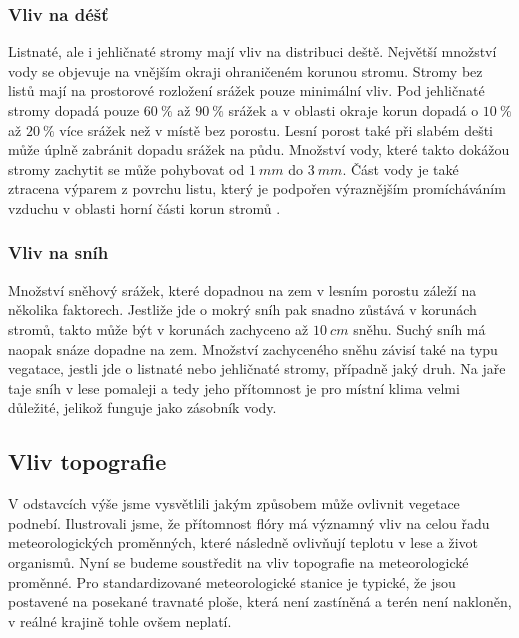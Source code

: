 \subsubsection{Vliv na déšť}
Listnaté, ale i jehličnaté stromy mají vliv na distribuci deště. Největší množství vody se objevuje na vnějším okraji ohraničeném korunou stromu. Stromy bez listů mají na prostorové rozložení srážek pouze minimální vliv. Pod jehličnaté stromy dopadá pouze $\SI{60}{\%}$ až $\SI{90}{\%}$ srážek a v oblasti okraje korun dopadá o $\SI{10}{\%}$ až $\SI{20}{\%}$ více srážek než v místě bez porostu. Lesní porost také při slabém dešti může úplně zabránit dopadu srážek na půdu. Množství vody, které takto dokážou stromy zachytit se může pohybovat od $\SI{1}{mm}$ do $\SI{3}{mm}$. Část vody je také ztracena výparem z povrchu listu, který je podpořen výraznějším promícháváním vzduchu v oblasti horní části korun stromů \cite{alma}.

\subsubsection{Vliv na sníh}
Množství sněhový srážek, které dopadnou na zem v lesním porostu záleží na několika faktorech. Jestliže jde o mokrý sníh pak snadno zůstává v korunách stromů, takto může být v korunách zachyceno až $\SI{10}{cm}$ sněhu. Suchý sníh má naopak snáze dopadne na zem. Množství zachyceného sněhu závisí také na typu vegatace, jestli jde o listnaté nebo jehličnaté stromy, případně jaký druh. Na jaře taje sníh v lese pomaleji a tedy jeho přítomnost je pro místní klima velmi důležité, jelikož funguje jako zásobník vody\cite{alma}.

\subsection{Vliv topografie} \label{chap:topo}
V odstavcích výše jsme vysvětlili jakým způsobem může ovlivnit vegetace podnebí. Ilustrovali jsme, že přítomnost flóry má významný vliv na celou řadu meteorologických proměnných, které následně ovlivňují teplotu v lese a život organismů. Nyní se budeme soustředit na vliv topografie na meteorologické proměnné. Pro standardizované meteorologické stanice je typické, že jsou postavené na posekané travnaté ploše, která není zastíněná a terén není nakloněn, v reálné krajině tohle ovšem neplatí.

